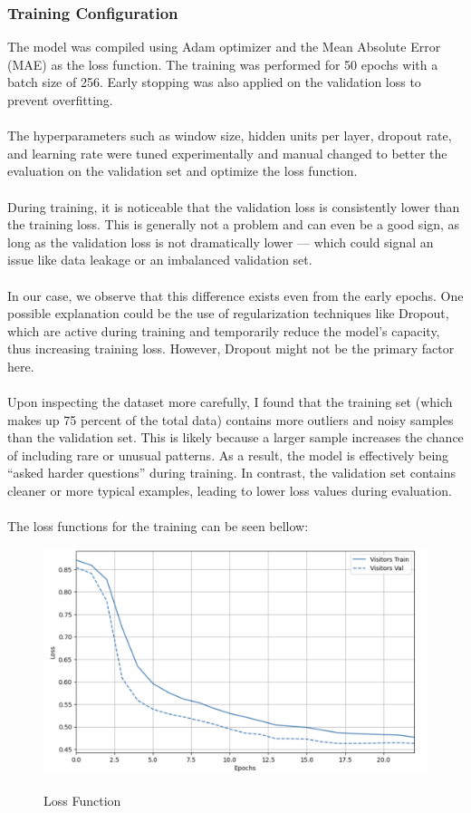 \documentclass{article}
\begin{document}
\subsubsection{Training Configuration}
The model was compiled using Adam optimizer and the Mean Absolute Error (MAE) as the loss function. The training was performed for 50 epochs with a batch size of 256. Early stopping was also applied on the validation loss to prevent overfitting.\\
\\
The hyperparameters such as window size, hidden units per layer, dropout rate, and learning rate were tuned experimentally and manual changed to better the evaluation on the validation set and optimize the loss function.\\
\\
During training, it is noticeable that the validation loss is consistently lower than the training loss. This is generally not a problem and can even be a good sign, as long as the validation loss is not dramatically lower — which could signal an issue like data leakage or an imbalanced validation set.\\
\\
In our case, we observe that this difference exists even from the early epochs. One possible explanation could be the use of regularization techniques like Dropout, which are active during training and temporarily reduce the model’s capacity, thus increasing training loss. However, Dropout might not be the primary factor here.\\
\\
Upon inspecting the dataset more carefully, I found that the training set (which makes up 75 percent  of the total data) contains more outliers and noisy samples than the validation set. This is likely because a larger sample increases the chance of including rare or unusual patterns. As a result, the model is effectively being “asked harder questions” during training. In contrast, the validation set contains cleaner or more typical examples, leading to lower loss values during evaluation.\\
\\
The loss functions for the training can be seen bellow:

\begin{figure}[h]
\includegraphics[width=1\linewidth]{images/loss_function.png}
    \label{fig:mesh1}
    \caption{Loss Function}
\end{figure}
\end{document}
